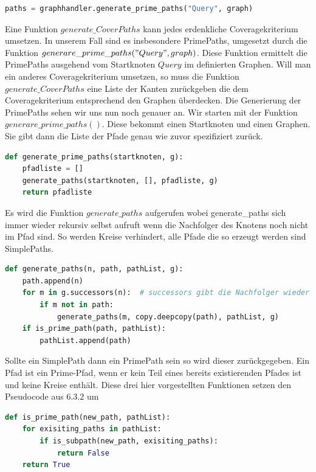 \begin{lstlisting}[language=Python]
paths = graphhandler.generate_prime_paths("Query", graph)
\end{lstlisting}

Eine Funktion $generate\_CoverPaths$ kann jedes erdenkliche Coveragekriterium umsetzen.
In unserem Fall sind es insbesondere PrimePaths, umgesetzt durch die Funktion $generare\_prime\_paths("Query", graph)$.
Diese Funktion ermittelt die PrimePaths ausgehend vom Startknoten $Query$ im definierten Graphen.
Will man ein anderes Coveragekriterium umsetzen, so muss die Funktion $generate\_CoverPaths$ eine Liste der Kanten zurückgeben
die dem Coveragekriterium entsprechend den Graphen überdecken.
Die Generierung der PrimePaths sehen wir uns nun noch genauer an.
Wir starten mit der Funktion $generare\_prime\_paths()$.
Diese bekommt einen Startknoten und einen Graphen.
Sie gibt dann die Liste der Pfade genau wie zuvor spezifiziert zurück.

\begin{lstlisting}[language=Python]
def generate_prime_paths(startknoten, g):
    pfadliste = []
    generate_paths(startknoten, [], pfadliste, g)
    return pfadliste
\end{lstlisting}

Es wird die Funktion $generate\_paths$ aufgerufen wobei generate\_paths sich immer wieder rekursiv selbst aufruft wenn die Nachfolger des Knotens
noch nicht im Pfad sind. So werden Kreise verhindert, alle Pfade die so erzeugt werden sind SimplePaths.

\begin{lstlisting}[language=Python]
def generate_paths(n, path, pathList, g):
    path.append(n)
    for m in g.successors(n):  # successors gibt die Nachfolger wieder
        if m not in path:
            generate_paths(m, copy.deepcopy(path), pathList, g)
    if is_prime_path(path, pathList):
        pathList.append(path)
\end{lstlisting}

Sollte ein SimplePath dann ein PrimePath sein so wird dieser zurückgegeben.
Ein Pfad ist ein Prime-Pfad, wenn er kein Teil eines bereits existierenden Pfades ist und keine Kreise enthält.
Diese drei hier vorgestellten Funktionen setzen den Pseudocode aus $6.3.2$ um

\begin{lstlisting}[language=Python]
def is_prime_path(new_path, pathList):
    for exisiting_paths in pathList:
        if is_subpath(new_path, exisiting_paths):
            return False
    return True
\end{lstlisting}

